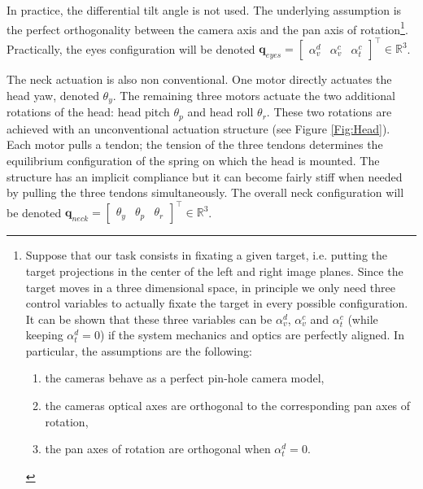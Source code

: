 In practice, the differential tilt angle is not used. The underlying assumption is the perfect orthogonality between the camera axis and the pan axis of rotation\footnote{\samepage Suppose that our task consists in fixating a given target, i.e. putting the target projections in the center of the left and right image planes. Since the target moves in a three dimensional space, in principle we only need three control variables to actually fixate the target in every possible configuration. It can be shown that these three variables can be $\alpha_v^d$, $\alpha_v^c$ and $\alpha_t^c$ (while keeping $\alpha_t^d=0$) if the system mechanics and optics are perfectly aligned. In particular, the assumptions are the following:
\begin{enumerate}
\item the cameras behave as a perfect pin-hole camera model,
\item the cameras optical axes are orthogonal to the corresponding pan axes of rotation,
\item the pan axes of rotation are orthogonal when $\alpha_t^d=0$.
\end{enumerate}}. Practically, the eyes configuration will be denoted $\mathbf q_{eyes} = \begin{bmatrix} \alpha_v^d & \alpha_v^c & \alpha_t^c \end{bmatrix}^\top \in \mathbb R^3$.


The neck actuation is also non conventional. One motor directly actuates the head yaw, denoted $\theta_y$. The remaining three motors actuate the two additional rotations of the head: head pitch $\theta_p$ and head roll $\theta_r$. These two rotations are achieved with an unconventional actuation structure (see Figure \ref{Fig:Head}). Each motor pulls a tendon; the tension of the three tendons determines the equilibrium configuration of the spring on which the head is mounted. The structure has an implicit compliance but it can become fairly stiff when needed by pulling the three tendons simultaneously. The overall neck configuration will be denoted $\mathbf q_{neck} = \begin{bmatrix} \theta_y & \theta_p & \theta_r \end{bmatrix}^\top \in \mathbb R^3$.


